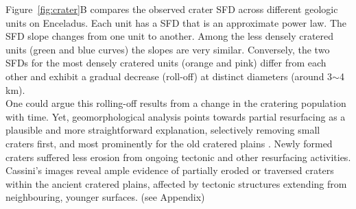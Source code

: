 \documentclass[preprint,12pt,3p,times,authoryear]{elsarticle}
\begin{document}
{Figure~\ref{fig:crater}B compares the observed crater SFD across different geologic units on Enceladus. Each unit has a SFD that is an approximate power law. The SFD slope changes from one unit to another. Among the less densely cratered units (green and blue curves) the slopes are very similar. Conversely, the two SFDs for the most densely cratered units (orange and pink) differ from each other and exhibit a gradual decrease (roll-off) at distinct diameters (around 3$\sim$4 km).\\

One could argue this rolling-off results from a change in the cratering population with time. Yet, geomorphological analysis points towards partial resurfacing as a plausible and more straightforward explanation, selectively removing small craters first, and most prominently for the old cratered plains \citep{Michael2010}. Newly formed craters suffered less erosion from ongoing tectonic and other resurfacing activities. Cassini’s images reveal ample evidence of partially eroded or traversed craters within the ancient cratered plains, affected by tectonic structures extending from neighbouring, younger surfaces. (see Appendix)\\



}
\end{document}
